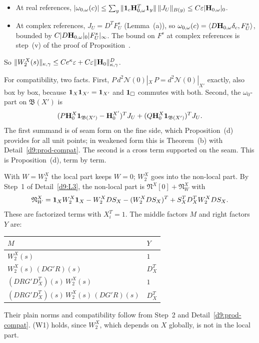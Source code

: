 \begin{detail}
\begin{step}
\begin{itemize}
\item At real references, $|\omega_{0,\omega}(c)|\le\sum_y\|\mathbf 1_c\mathbf H_{0,\omega}^T\mathbf 1_y\|\,\|J_U\|_{B(y)}\le C\varepsilon|\mathbf H_{0,\omega}|_0$.
\item At complex references, $J_U=D^TF^s_U$ (Lemma~(a)), so $\omega_{0,\omega}(c)=\langle D\mathbf H_{0,\omega}\delta_c,F^s_U\rangle$, bounded by $C|D\mathbf H_{0,\omega}|_0|F^s_U|_\infty$. The bound on $F^s$ at complex references is step~(v) of the proof of Proposition~.
\end{itemize}
So $\|W_2^X(s)\|_{\kappa,\gamma}\le Ce^\kappa\varepsilon+C\varepsilon\|\mathbf H_0\|^D_{\kappa,\gamma}$.

For compatibility, two facts. First, $P\,d^2\mathcal N(0)|_X\,P=d^2\mathcal N(0)|_{X'}$ exactly, also box by box, because $\mathbf 1_X\mathbf 1_{X'}=\mathbf 1_{X'}$ and $\mathbf 1_\Box$ commutes with both. Second, the $\omega_0$-part on $\mathfrak B(X')$ is
\[
(P\mathbf H_0^X\mathbf 1_{\mathfrak B(X')}-\mathbf H_0^{X'})^TJ_U+(Q\mathbf H_0^X\mathbf 1_{\mathfrak B(X')})^TJ_U .
\]
The first summand is of seam form on the fine side, which Proposition~(d) provides for all unit points; in weakened form this is Theorem~(b) with Detail~\ref{d9:prod-compat}. The second is a cross term supported on the seam. This is Proposition~(d), term by term.
\end{step}
\begin{step}
With $W=W_2^X$ the local part keeps $W=0$; $W_2^X$ goes into the non-local part. By Step~1 of Detail~\ref{d9:L3}, the non-local part is $\mathfrak N^X[0]+\mathfrak N^X_{W}$ with
\[
\mathfrak N^X_W=\mathbf 1_XW_2^X\mathbf 1_X-W_2^XDS_X-(W_2^XDS_X)^T+S_X^TD_X^TW_2^XDS_X .
\]
These are factorized terms with $X_i^T=1$. The middle factors $M$ and right factors $Y$ are:
\begin{center}
\begin{tabular}{@{}ll@{}}
\toprule
$M$ & $Y$\\
\midrule
$W_2^X(s)$ & $1$\\
$W_2^X(s)\,(DG'R)(s)$ & $D^T_X$\\
$(DRG'D^T_X)(s)\,W_2^X(s)$ & $1$\\
$(DRG'D^T_X)(s)\,W_2^X(s)\,(DG'R)(s)$ & $D^T_X$\\
\bottomrule
\end{tabular}
\end{center}
Their plain norms and compatibility follow from Step~2 and Detail~\ref{d9:prod-compat}. (W1) holds, since $W_2^X$, which depends on $X$ globally, is not in the local part.

\end{step}
\end{detail}
